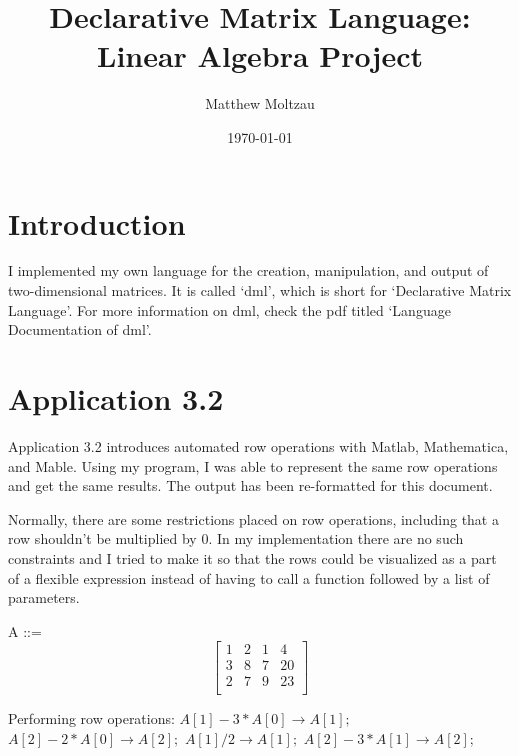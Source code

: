 \documentclass{article}
\title{Declarative Matrix Language: Linear Algebra Project}
\author{Matthew Moltzau}
\date{\today}
\begin{document}
 
 \maketitle 
 \begin{flushleft}

\section*{Introduction}

I implemented my own language for the creation, manipulation, and output of two-dimensional
matrices. It is called `dml', which is short for `Declarative Matrix Language'. For more
information on dml, check the pdf titled `Language Documentation of dml'.


\section*{Application 3.2}

Application 3.2 introduces automated row operations with Matlab, Mathematica, and Mable.
Using my program, I was able to represent the same row operations and get the same results.
The output has been re-formatted for this document.
\newline

Normally, there are some restrictions placed on row operations, including that a row
shouldn't be multiplied by 0. In my implementation there are no such constraints and
I tried to make it so that the rows could be visualized as a part of a flexible expression
instead of having to call a function followed by a list of parameters.
\newline


A ::=
\[
\begin{bmatrix}
1  & 2  & 1  & 4 \\
3  & 8  & 7  & 20 \\
2  & 7  & 9  & 23 \\
\end{bmatrix} 
\]

Performing row operations:   \newline \newline
$A[1] - 3 * A[0] \rightarrow A[1];$     \newline
$A[2] - 2 * A[0] \rightarrow A[2];$     \newline
$A[1] / 2 \rightarrow A[1];       $     \newline
$A[2] - 3 * A[1] \rightarrow A[2];$     \newline



\end{flushleft}
\end{document}
